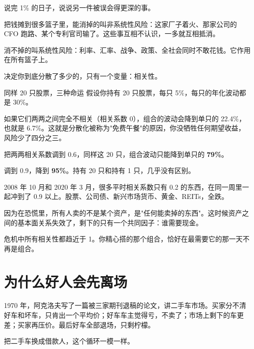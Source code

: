 说完 1\% 的日子，说说另一件被误会得更深的事。

把钱摊到很多篮子里，能消掉的叫非系统性风险：这家厂子着火、那家公司的 CFO 跑路、某个专利官司输了。这些事互相不认识，一多就互相抵消。

消不掉的叫系统性风险：利率、汇率、战争、政策、全社会同时不敢花钱。它作用在所有篮子上。

决定你到底分散了多少的，只有一个变量：相关性。

\begin{egbox}{同样 20 只股票，三种命运}
假设你持有 20 只股票，每只 5\%，每只的年化波动都是 30\%。

如果它们两两之间完全不相关（相关系数 0），组合的波动会降到单只的 22.4\%，也就是 6.7\%。这就是分散化被称为"免费午餐"的原因，你没牺牲任何期望收益，风险少了四分之三。

把两两相关系数调到 0.6，同样这 20 只，组合波动只能降到单只的 \textbf{79\%}。

调到 0.9，降到 \textbf{95\%}。持有 20 只和持有 1 只，几乎没有区别。

2008 年 10 月和 2020 年 3 月，很多平时相关系数只有 0.2 的东西，在同一周里一起冲到了 0.9 以上。股票、公司债、新兴市场货币、黄金、REITs，全跌。

\end{egbox}

因为在恐慌里，所有人卖的不是某个资产，是"任何能卖掉的东西"。这时候资产之间的基本面关系失效了，剩下的只有一个共同因子：谁需要现金。

\begin{pullquote}{}
危机中所有相关性都趋近于 1。你精心搭的那个组合，恰好在最需要它的那一天不再是组合。
\end{pullquote}

\section{为什么好人会先离场}

1970 年，阿克洛夫写了一篇被三家期刊退稿的论文，讲二手车市场。买家分不清好车和坏车，只肯出一个平均价；好车车主觉得亏，不卖了；市场上剩下的车更差；买家再压价。最后好车全部退场，只剩柠檬。

把二手车换成借款人，这个循环一模一样。

\begin{chainflow}
\chainarrow {}\chainarrow {}\chainarrow {}\chainarrow {}\chainarrow {}
\end{chainflow}

